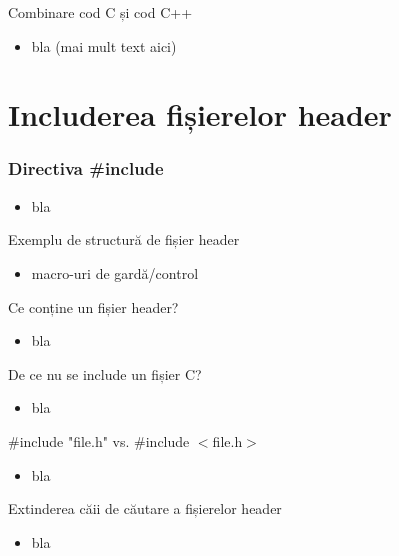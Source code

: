 \documentclass{beamer}
\begin{document}
\begin{frame}{Combinare cod C și cod C++}
  \begin{itemize}
    \item bla (mai mult text aici)
  \end{itemize}
\end{frame}

\section{Includerea fișierelor header}

\frame{\tableofcontents[currentsection]}

\begin{frame}
  \frametitle{Directiva \#include}
  \begin{itemize}
    \item bla
  \end{itemize}
\end{frame}

\begin{frame}{Exemplu de structură de fișier header}
  \begin{itemize}
    \item macro-uri de gardă/control
  \end{itemize}
\end{frame}

\begin{frame}{Ce conține un fișier header?}
  \begin{itemize}
    \item bla
  \end{itemize}
\end{frame}

\begin{frame}{De ce nu se include un fișier C?}
  \begin{itemize}
    \item bla
  \end{itemize}
\end{frame}

\begin{frame}{\#include "file.h" vs. \#include $<$file.h$>$}
  \begin{itemize}
    \item bla
  \end{itemize}
\end{frame}

\begin{frame}{Extinderea căii de căutare a fișierelor header}
  \begin{itemize}
    \item bla
  \end{itemize}
\end{frame}
\end{document}
